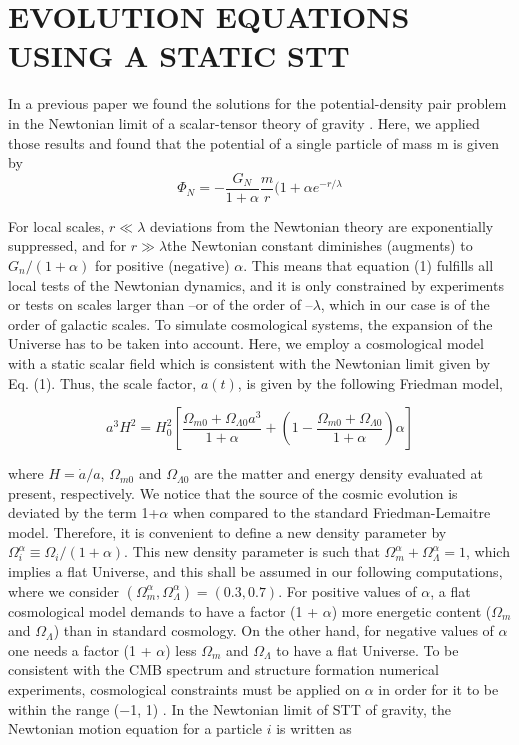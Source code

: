\documentclass[10pt,journal]{IEEEtran}
\begin{document}
\section{EVOLUTION EQUATIONS USING A STATIC STT}
In a previous paper we found the solutions for the
potential-density pair problem in the Newtonian limit of
a scalar-tensor theory of gravity \cite{11}. Here, we applied
those results and found that the potential of a single particle of mass m is given by \cite{12}
\begin{equation}
    \Phi_N = - \frac{G_N}{1+ \alpha}\frac{m}{r}(1+\alpha e^{-r/\lambda}
\end{equation}

For local scales, $r \ll \lambda$ deviations from the Newtonian
theory are exponentially suppressed, and for $r \gg \lambda$the
Newtonian constant diminishes (augments) to $G_n/(1+\alpha)$ for positive (negative) $\alpha$. This means that equation
(1) fulfills all local tests of the Newtonian dynamics, and
it is only constrained by experiments or tests on scales
larger than –or of the order of –$\lambda$, which in our case is of
the order of galactic scales.
To simulate cosmological systems, the expansion of the
Universe has to be taken into account. Here, we employ a
cosmological model with a static scalar field which is consistent with the Newtonian limit given by Eq. (1). Thus,
the scale factor, $a(t)$, is given by the following Friedman
model,

\begin{equation}
    a^3H^2=H_{0}^{2} \left[\frac{\Omega_{m0}+\Omega_{\Lambda 0}a^3}{1+\alpha}+\left(1-\frac{\Omega_{m0}+\Omega_{\Lambda 0}}{1+\alpha}\right)\alpha \right]
\end{equation}

where $H=\Dot{a}/a$, $\Omega_{m0}$ and $\Omega_{\Lambda 0}$ are the matter and energy
density evaluated at present, respectively. We notice that
the source of the cosmic evolution is deviated by the term
1+$\alpha$ when compared to the standard Friedman-Lemaitre
model. Therefore, it is convenient to define a new density parameter by $\Omega_{i}^{\alpha}\equiv \Omega_i / (1+\alpha)$. This new density parameter is such that $\Omega_{m}^{\alpha}+\Omega_{\Lambda}^{\alpha}=1$, which implies a
flat Universe, and this shall be assumed in our following
computations, where we consider $(\Omega_{m}^{\alpha},\Omega_{\Lambda}^{\alpha})=(0.3,0.7)$.
For positive values of $\alpha$, a flat cosmological model demands to have a factor (1 + $\alpha$) more energetic content
($\Omega_m$ and $\Omega_\Lambda$) than in standard cosmology. On the other
hand, for negative values of $\alpha$ one needs a factor (1 + $\alpha$)
less $\Omega_m$ and $\Omega_\Lambda$ to have a flat Universe. To be consistent with the CMB spectrum and structure formation
numerical experiments, cosmological constraints must be
applied on $\alpha$ in order for it to be within the range (−1, 1)
\cite{13,14,15,16}.
In the Newtonian limit of STT of gravity, the Newtonian motion equation for a particle $i$ is written as
\end{document}
